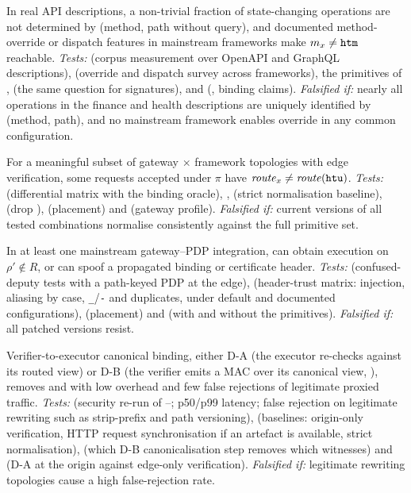 \begin{description}[leftmargin=0pt,itemsep=3pt]
\item[\Hyp{1} (\GA).] In real API descriptions, a non-trivial fraction of
state-changing operations are not determined by (method, path without query),
and documented method-override or dispatch features in mainstream frameworks
make $m_x \neq \texttt{htm}$ reachable.
\emph{Tests:}  (corpus measurement over OpenAPI and GraphQL descriptions),
 (override and dispatch survey across frameworks), the \GA primitives
of ,  (the same question for signatures), and 
(, binding claims).
\emph{Falsified if:} nearly all operations in the finance and health
descriptions are uniquely identified by (method, path), and no mainstream
framework enables override in any common configuration.

\item[\Hyp{2} (\GB).] For a meaningful subset of gateway $\times$ framework
topologies with edge verification, some requests accepted under $\pi$ have
$\mathit{route}_x \neq \mathit{route}(\texttt{htu})$.
\emph{Tests:}  (differential matrix with the binding oracle),
,  (strict normalisation baseline),  (drop \htu),
 (placement) and  (gateway profile).
\emph{Falsified if:} current versions of all tested combinations normalise
consistently against the full primitive set.

\item[\Hyp{3} (\GC, confused deputy).] In at least one mainstream gateway--PDP
integration, \Aclient can obtain execution on $\rho' \notin R$, or can spoof a
propagated binding or certificate header.
\emph{Tests:}  (confused-deputy tests with a path-keyed PDP at the
edge),  (header-trust matrix: injection, aliasing by case,
\texttt{\_}/\texttt{-} and duplicates, under default and documented configurations),
 (placement) and  (with and without the \GC primitives).
\emph{Falsified if:} all patched versions resist.

\item[\Hyp{4} (defence).] Verifier-to-executor canonical binding, either
D-A (the executor re-checks against its routed view) or D-B (the verifier emits a
MAC over its canonical view, ), removes \GB and \GC with
low overhead and few false rejections of legitimate proxied traffic.
\emph{Tests:}  (security re-run of --; p50/p99 latency;
false rejection on legitimate rewriting such as strip-prefix and path
versioning),  (baselines: origin-only verification, HTTP request
synchronisation if an artefact is available, strict normalisation),
 (which D-B canonicalisation step removes which \GB witnesses) and
 (D-A at the origin against edge-only verification).
\emph{Falsified if:} legitimate rewriting topologies cause a high false-rejection rate.


\end{description}
